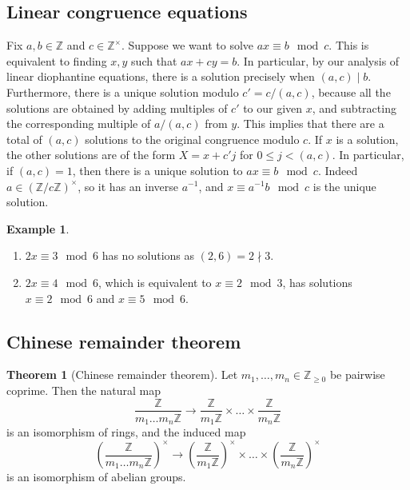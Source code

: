 \documentclass{article}
\newcommand{\Z}{\mathbb{Z}}
\newcommand{\rb}[1]{\left( #1 \right)}
\newcommand{\unit}[1]{\rb{\Z / #1\Z}^\times}
\theoremstyle{definition}\newtheorem{definition}{Definition}
\theoremstyle{definition}\newtheorem{remark}[definition]{Remark}
\theoremstyle{definition}\newtheorem*{example}{Example}
\theoremstyle{definition}\newtheorem*{note}{Note}
\newtheorem{theorem}[definition]{Theorem}
\begin{document}

\subsection{Linear congruence equations}

Fix $ a, b \in \Z $ and $ c \in \Z^\times $. Suppose we want to solve $ ax \equiv b \mod c $. This is equivalent to finding $ x, y $ such that $ ax + cy = b $. In particular, by our analysis of linear diophantine equations, there is a solution precisely when $ \rb{a, c} \mid b $. Furthermore, there is a unique solution modulo $ c' = c / \rb{a, c} $, because all the solutions are obtained by adding multiples of $ c' $ to our given $ x $, and subtracting the corresponding multiple of $ a / \rb{a, c} $ from $ y $. This implies that there are a total of $ \rb{a, c} $ solutions to the original congruence modulo $ c $. If $ x $ is a solution, the other solutions are of the form $ X = x + c'j $ for $ 0 \le j < \rb{a, c} $. In particular, if $ \rb{a, c} = 1 $, then there is a unique solution to $ ax \equiv b \mod c $. Indeed $ a \in \unit{c} $, so it has an inverse $ a^{-1} $, and $ x \equiv a^{-1}b \mod c $ is the unique solution.

\begin{example}
\hfill
\begin{enumerate}
\item $ 2x \equiv 3 \mod 6 $ has no solutions as $ \rb{2, 6} = 2 \nmid 3 $.
\item $ 2x \equiv 4 \mod 6 $, which is equivalent to $ x \equiv 2 \mod 3 $, has solutions $ x \equiv 2 \mod 6 $ and $ x \equiv 5 \mod 6 $.
\end{enumerate}

\end{example}

\subsection{Chinese remainder theorem}

\begin{theorem}[Chinese remainder theorem]
Let $ m_1, \dots, m_n \in \Z_{\ge 0} $ be pairwise coprime. Then the natural map
$$ \dfrac{\Z}{m_1 \dots m_n\Z} \to \dfrac{\Z}{m_1\Z} \times \dots \times \dfrac{\Z}{m_n\Z} $$
is an isomorphism of rings, and the induced map
$$ \rb{\dfrac{\Z}{m_1 \dots m_n\Z}}^\times \to \rb{\dfrac{\Z}{m_1\Z}}^\times \times \dots \times \rb{\dfrac{\Z}{m_n\Z}}^\times $$
is an isomorphism of abelian groups.
\end{theorem}
\end{document}
